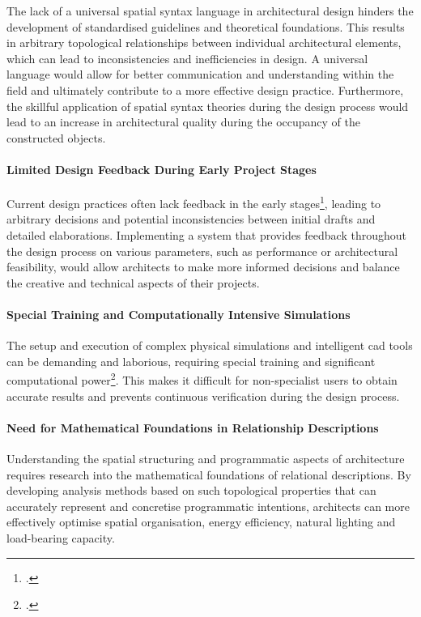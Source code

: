 \documentclass[a4paper, 12pt]{report}
\begin{document}
The lack of a universal spatial syntax language in architectural design hinders the development of standardised guidelines and theoretical foundations. This results in arbitrary topological relationships between individual architectural elements, which can lead to inconsistencies and inefficiencies in design. A universal language would allow for better communication and understanding within the field and ultimately contribute to a more effective design practice. Furthermore, the skillful application of spatial syntax theories during the design process would lead to an increase in architectural quality during the occupancy of the constructed objects.

\paragraph{Limited Design Feedback During Early Project Stages}

Current design practices often lack feedback in the early stages\footcite{paterson2013real}, leading to arbitrary decisions and potential inconsistencies between initial drafts and detailed elaborations. Implementing a system that provides feedback throughout the design process on various parameters, such as performance or architectural feasibility, would allow architects to make more informed decisions and balance the creative and technical aspects of their projects.

\paragraph{Special Training and Computationally Intensive Simulations}

The setup and execution of complex physical simulations and intelligent \acrshort{cad} tools can be demanding and laborious, requiring special training and significant computational power\footcite{chatzivasileiadi2018effect}. This makes it difficult for non-specialist users to obtain accurate results and prevents continuous verification during the design process.

\paragraph{Need for Mathematical Foundations in Relationship Descriptions}

Understanding the spatial structuring and programmatic aspects of architecture requires research into the mathematical foundations of relational descriptions. By developing analysis methods based on such topological properties that can accurately represent and concretise programmatic intentions, architects can more effectively optimise spatial organisation, energy efficiency, natural lighting and load-bearing capacity.
\end{document}
